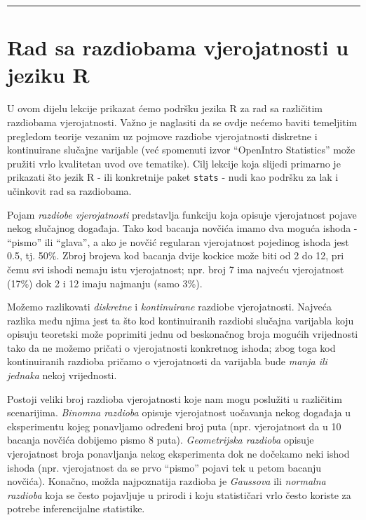 \documentclass[]{book}
\theoremstyle{definition}
\theoremstyle{definition}
\theoremstyle{definition}
\theoremstyle{remark}
\begin{document}
\begin{center}\rule{0.5\linewidth}{\linethickness}\end{center}

\section{Rad sa razdiobama vjerojatnosti u jeziku
R}\label{rad-sa-razdiobama-vjerojatnosti-u-jeziku-r}

U ovom dijelu lekcije prikazat ćemo podršku jezika R za rad sa
različitim razdiobama vjerojatnosti. Važno je naglasiti da se ovdje
nećemo baviti temeljitim pregledom teorije vezanim uz pojmove razdiobe
vjerojatnosti diskretne i kontinuirane slučajne varijable (već spomenuti
izvor ``OpenIntro Statistics'' može pružiti vrlo kvalitetan uvod ove
tematike). Cilj lekcije koja slijedi primarno je prikazati što jezik R -
ili konkretnije paket \texttt{stats} - nudi kao podršku za lak i
učinkovit rad sa razdiobama.

Pojam \emph{razdiobe vjerojatnosti} predstavlja funkciju koja opisuje
vjerojatnost pojave nekog slučajnog događaja. Tako kod bacanja novčića
imamo dva moguća ishoda - ``pismo'' ili ``glava'', a ako je novčić
regularan vjerojatnost pojedinog ishoda jest 0.5, tj. 50\%. Zbroj
brojeva kod bacanja dvije kockice može biti od 2 do 12, pri čemu svi
ishodi nemaju istu vjerojatnost; npr. broj 7 ima najveću vjerojatnost
(17\%) dok 2 i 12 imaju najmanju (samo 3\%).

Možemo razlikovati \emph{diskretne} i \emph{kontinuirane} razdiobe
vjerojatnosti. Najveća razlika među njima jest ta što kod kontinuiranih
razdiobi slučajna varijabla koju opisuju teoretski može poprimiti jednu
od beskonačnog broja mogućih vrijednosti tako da ne možemo pričati o
vjerojatnosti konkretnog ishoda; zbog toga kod kontinuiranih razdioba
pričamo o vjerojatnosti da varijabla bude \emph{manja ili jednaka} nekoj
vrijednosti.

Postoji veliki broj razdioba vjerojatnosti koje nam mogu poslužiti u
različitim scenarijima. \emph{Binomna razdioba} opisuje vjerojatnost
uočavanja nekog događaja u eksperimentu kojeg ponavljamo određeni broj
puta (npr. vjerojatnost da u 10 bacanja novčića dobijemo pismo 8 puta).
\emph{Geometrijska razdioba} opisuje vjerojatnost broja ponavljanja
nekog eksperimenta dok ne dočekamo neki ishod ishoda (npr. vjerojatnost
da se prvo ``pismo'' pojavi tek u petom bacanju novčića). Konačno, možda
najpoznatija razdioba je \emph{Gaussova} ili \emph{normalna razdioba}
koja se često pojavljuje u prirodi i koju statističari vrlo često
koriste za potrebe inferencijalne statistike.
\end{document}
